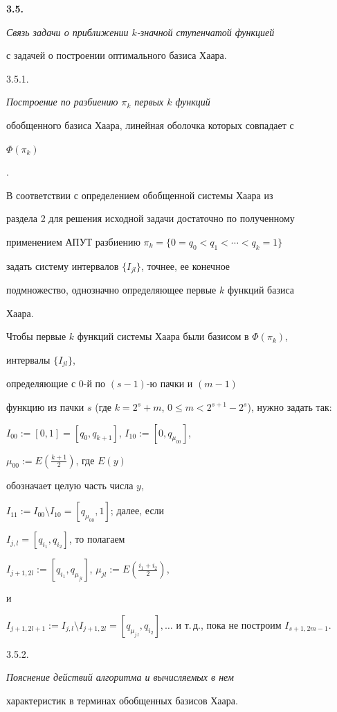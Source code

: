 {\bf 3.5.} {\it Связь задачи о приближении $k$-значной ступенчатой функцией


с задачей о построении оптимального базиса Хаара.}





{3.5.1.} {\it Построение по разбиению $\pi_k$ первых $k$ функций


обобщенного базиса Хаара, линейная оболочка которых совпадает с


$\Phi(\pi_k)$}.


В соответствии с определением обобщенной системы Хаара из


раздела 2 для решения исходной задачи достаточно по полученному


применением АПУТ разбиению $\pi_k=\{0=q_0<q_1<\dotsb<q_k=1\}$


задать систему интервалов $\{I_{jl}\}$, точнее, ее конечное


подмножество, однозначно определяющее первые $k$ функций базиса


Хаара.





Чтобы первые $k$ функций системы Хаара были базисом в $\Phi(\pi_k)$,


интервалы $\{I_{jl}\}$,


определяющие с 0-й по $(s-1)$-ю пачки и $(m-1)$


функцию из пачки $s$ (где $k=2^s+m$, $0\leq


m<2^{s+1}-2^s$), нужно задать так:


$I_{00}:=[0,1]=[q_0,q_{k+1}]$, $I_{10}:=[0,q_{\mu_{00}}]$,


$\mu_{00}:=E(\frac{k+1}{2})$, где $E(y)$


обозначает целую часть числа $y$,


$I_{11}:=I_{00}\setminus I_{10}=[q_{\mu_{00}},1]$; далее, если


$I_{j,l}=[q_{i_1},q_{i_2}]$, то полагаем


$I_{j+1,2l}:=[q_{i_1},q_{\mu_{jl}}]$, $\mu_{jl}:=E(\frac{i_1+i_2}{2})$,


и


$I_{j+1,2l+1}:=I_{j,l}\setminus I_{j+1,2l}= [q_{\mu_{j\,l}},


q_{i_2}],\dotsc$ и т.\,д., пока не построим $I_{s+1,2m-1}$.


\medskip





{3.5.2.} {\it Пояснение действий алгоритма и вычисляемых в нем


характеристик в терминах обобщенных базисов Хаара.}


